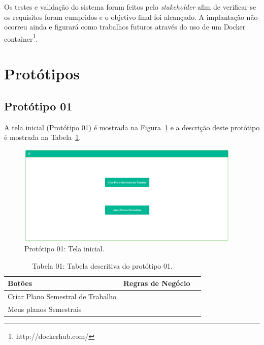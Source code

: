 Os testes e validação do sistema foram feitos pelo \textit{stakeholder} afim de verificar se os requisitos foram cumpridos e o objetivo final foi alcançado.
A implantação não ocorreu ainda e figurará como trabalhos futuros através do uso de um Docker container\footnote{http://dockerhub.com/}.

\newpage
\section{Protótipos}\label{Prototipos}
\subsection{Protótipo 01}\label{prototipo01}

A tela inicial (Protótipo 01) é mostrada na Figura~\ref{fig:prot01} e a descrição deste protótipo é mostrada na Tabela~\ref{tab:prot01}.

\begin{figure}[H]
    \centering
    \includegraphics[width=0.95\textwidth]{img/1pagina_inicial.png}
    \caption[Protótipo 01: Tela inicial]{Protótipo 01: Tela inicial.}
    \label{fig:prot01}
\end{figure}

\begin{table}[H]
\centering
\caption[Tabela 01: Tabela descritiva do protótipo 01.]{Tabela 01: Tabela descritiva do protótipo 01.}
\label{tab:prot01}
\begin{tabular}{@{}lll@{}}
\toprule
Botões                &  Regras de Negócio                                \\ \midrule
Criar Plano Semestral de Trabalho      &     \nameref{rn016}              \\
Meus planos Semestrais                 &      \nameref{rn017}              \\ \bottomrule
\end{tabular}
\end{table}

